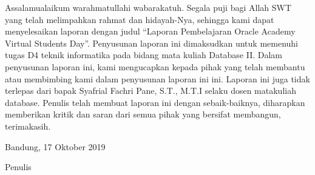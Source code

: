 \begin{acknowledgements}
\par
Assalamualaikum warahmatullahi wabarakatuh. Segala puji bagi Allah SWT yang telah melimpahkan rahmat dan hidayah-Nya, sehingga kami dapat menyelesaikan laporan dengan judul “Laporan Pembelajaran Oracle Academy Virtual Students Day”. Penyusunan laporan ini dimaksudkan untuk memenuhi tugas D4 teknik informatika pada bidang mata kuliah Database II. Dalam penyusunan laporan ini, kami mengucapkan kepada pihak yang telah membantu atau membimbing kami dalam penyusunan laporan ini ini. Laporan ini juga tidak terlepas dari bapak Syafrial Fachri Pane, S.T., M.T.I selaku dosen matakuliah database. Penulis telah membuat laporan ini dengan sebaik-baiknya, diharapkan memberikan kritik dan saran dari semua pihak yang bersifat membangun, terimakasih.

\begin{raggedleft}




\vspace{12ex}
Bandung, 17 Oktober 2019

\vspace{6ex}
Penulis

\end{raggedleft}

\end{acknowledgements}